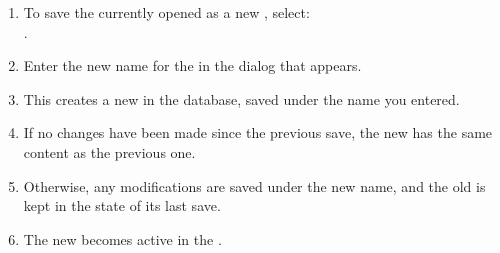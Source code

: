 
\begin{enumerate}
\item To save the currently opened \gdproject{} as a new \gdproject{}, select:\\
. 
\item Enter the new name for the \gdproject{} in the dialog that appears. 
\item This creates a new \gdproject{} in the database, saved under the name you entered. 
\item If no changes have been made since the previous \gdproject{} save, the
new \gdproject{} has the same content as  the previous one.
\item Otherwise, any modifications are saved under the new \gdproject{} name,
and the old \gdproject{} is kept in the state of its last save.
\item The new \gdproject{} becomes active in the \app{} \ite{}.
\end{enumerate}






